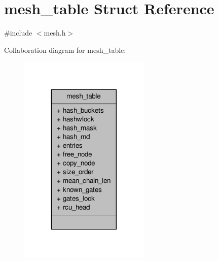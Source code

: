 \hypertarget{structmesh__table}{\section{mesh\-\_\-table Struct Reference}
\label{structmesh__table}
}


{\ttfamily \#include $<$mesh.\-h$>$}



Collaboration diagram for mesh\-\_\-table\-:
\nopagebreak
\begin{figure}[H]
\begin{center}
\leavevmode
\includegraphics[width=176pt]{structmesh__table__coll__graph}
\end{center}
\end{figure}
